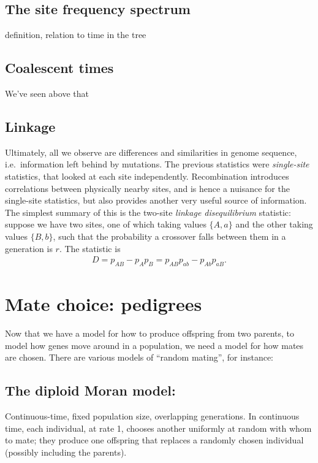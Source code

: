 \subsection{The site frequency spectrum}
definition, relation to time in the tree


\subsection{Coalescent times}
We've seen above that 


\subsection{Linkage}
Ultimately, all we observe are differences and similarities in genome sequence,
i.e.\ information left behind by mutations.
The previous statistics were \emph{single-site} statistics,
that looked at each site independently.
Recombination introduces correlations between physically nearby sites,
and is hence a nuisance for the single-site statistics,
but also provides another very useful source of information.
The simplest summary of this is the two-site \emph{linkage disequilibrium} statistic:
suppose we have two sites, one of which taking values $\{A,a\}$ and the other taking values $\{B,b\}$,
such that the probability a crossover falls between them in a generation is $r$.
The statistic is
\begin{align}
  D = p_{AB} - p_A p_B = p_{AB}p_{ab} - p_{Ab}p_{aB} .
\end{align}






\section{Mate choice: pedigrees}

Now that we have a model for how to produce offspring from two parents,
to model how genes move around in a population,
we need a model for how mates are chosen.
There are various models of ``random mating'',
for instance:

\subsection{The diploid Moran model:}
Continuous-time, fixed population size, overlapping generations.
In continuous time, each individual, at rate 1, chooses another uniformly at random
with whom to mate;
they produce one offspring
that replaces a randomly chosen individual (possibly including the parents).

